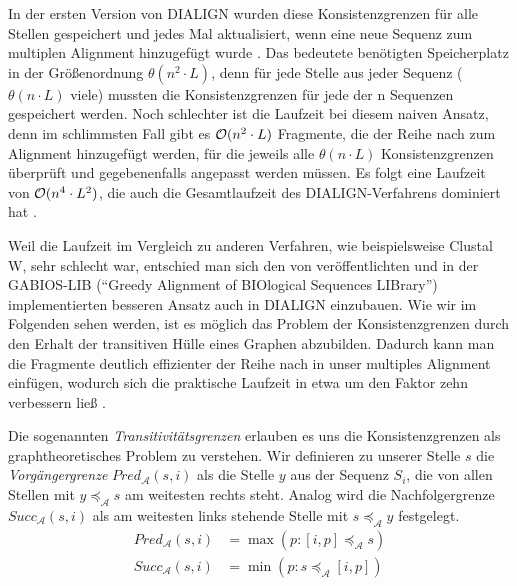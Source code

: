 In der ersten Version von DIALIGN wurden diese Konsistenzgrenzen für alle Stellen gespeichert und jedes Mal aktualisiert, wenn eine neue Sequenz zum multiplen Alignment hinzugefügt wurde \citep{mdw96}. Das bedeutete benötigten Speicherplatz in der Größenordnung $\theta(n^2\cdot L)$, denn für jede Stelle aus jeder Sequenz ($\theta(n\cdot L)$ viele) mussten die Konsistenzgrenzen für jede der n Sequenzen gespeichert werden. Noch schlechter ist die Laufzeit bei diesem naiven Ansatz, denn im schlimmsten Fall gibt es $\mathcal{O}(n^2\cdot L)$ Fragmente, die der Reihe nach zum Alignment hinzugefügt werden, für die jeweils alle $\theta(n\cdot L)$ Konsistenzgrenzen überprüft und gegebenenfalls angepasst werden müssen. Es folgt eine Laufzeit von $\mathcal{O}(n^4\cdot L^2)$, die auch die Gesamtlaufzeit des DIALIGN-Verfahrens dominiert hat \citep{m99}. 

Weil die Laufzeit im Vergleich zu anderen Verfahren, wie beispielsweise Clustal W, sehr schlecht war, entschied man sich den von \cite{a97} veröffentlichten und in der GABIOS-LIB (\enquote{Greedy Alignment of BIOlogical Sequences LIBrary}) implementierten besseren Ansatz auch in DIALIGN	einzubauen. Wie wir im Folgenden sehen werden, ist es möglich das Problem der Konsistenzgrenzen durch den Erhalt der transitiven Hülle eines Graphen abzubilden. Dadurch kann man die Fragmente deutlich effizienter der Reihe nach in unser multiples Alignment einfügen, wodurch sich die praktische Laufzeit in etwa um den Faktor zehn verbessern ließ \citep{am00}. 

\begin{definition}[Transitivitätsgrenzen]
	Die sogenannten \emph{Transitivitätsgrenzen} erlauben es uns die Konsistenzgrenzen als graphtheoretisches Problem zu verstehen. Wir definieren zu unserer Stelle $s$ die \emph{Vorgängergrenze} $Pred_{\mathcal{A}}(s,i)$ als die Stelle $y$ aus der Sequenz $S_i$, die von allen Stellen mit $y \preceq_{\mathcal{A}} s$ am weitesten rechts steht. Analog wird die Nachfolgergrenze $Succ_{\mathcal{A}}(s,i)$ als am weitesten links stehende Stelle mit $s \preceq_{\mathcal{A}} y$ festgelegt.
	\begin{equation}
	\begin{split}
		Pred_{\mathcal{A}}(s,i) &= \max(p: [i,p] \preceq_{\mathcal{A}} s) \\
		Succ_{\mathcal{A}}(s,i) &= \min(p: s \preceq_{\mathcal{A}} [i,p])
	\end{split}
	\end{equation}
\end{definition}


